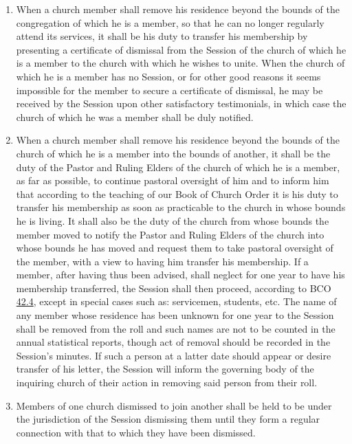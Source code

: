 \documentclass[
]{book}
\providecommand{\tightlist}{%
  \setlength{\itemsep}{0pt}\setlength{\parskip}{0pt}}
\begin{document}
\protect\hypertarget{chapter-slug-50-jurisdiction}{\href{}{}}

\begin{enumerate}
\def\labelenumi{\arabic{enumi}.}
\tightlist
\item
  \protect\hypertarget{50}{\href{}{}}When a church member shall remove his residence beyond the bounds of the congregation of which he is a member, so that he can no longer regularly attend its services, it shall be his duty to transfer his membership by presenting a certificate of dismissal from the Session of the church of which he is a member to the church with which he wishes to unite. When the church of which he is a member has no Session, or for other good reasons it seems impossible for the member to secure a certificate of dismissal, he may be received by the Session upon other satisfactory testimonials, in which case the church of which he was a member shall be duly notified.
\item
  When a church member shall remove his residence beyond the bounds of the church of which he is a member into the bounds of another, it shall be the duty of the Pastor and Ruling Elders of the church of which he is a member, as far as possible, to continue pastoral oversight of him and to inform him that according to the teaching of our Book of Church Order it is his duty to transfer his membership as soon as practicable to the church in whose bounds he is living. It shall also be the duty of the church from whose bounds the member moved to notify the Pastor and Ruling Elders of the church into whose bounds he has moved and request them to take pastoral oversight of the member, with a view to having him transfer his membership. If a member, after having thus been advised, shall neglect for one year to have his membership transferred, the Session shall then proceed, according to BCO \protect\hyperlink{42.4}{42.4}, except in special cases such as: servicemen, students, etc. The name of any member whose residence has been unknown for one year to the Session shall be removed from the roll and such names are not to be counted in the annual statistical reports, though act of removal should be recorded in the Session's minutes. If such a person at a latter date should appear or desire transfer of his letter, the Session will inform the governing body of the inquiring church of their action in removing said person from their roll.
\item
  Members of one church dismissed to join another shall be held to be under the jurisdiction of the Session dismissing them until they form a regular connection with that to which they have been dismissed.

\end{enumerate}
\end{document}
